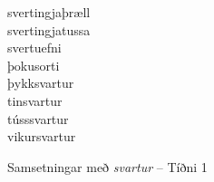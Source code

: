 \documentclass[../samsetningasafn.tex]{subfiles}
\begin{document}
\begin{bigwordlist}
\begin{footnotesize}
\begin{multicols}{4}
\begin{description}
		\item [svertingjaþræll]
		\item [svertingjatussa]
		\item [svertuefni]
		\item [þokusorti]
		\item [þykksvartur]
		\item [tinsvartur]
		\item [tússsvartur]
		\item [vikursvartur]
	\end{description}
\end{multicols}
\end{footnotesize}

\label{listi:svart1}
\caption{Samsetningar með \textit{svartur} -- Tíðni 1}
\end{bigwordlist}
\end{document}
